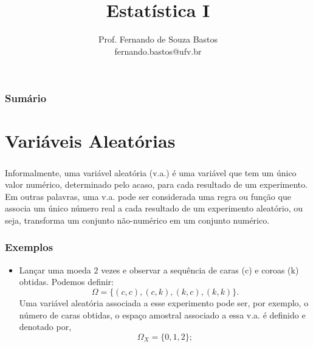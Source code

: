 \documentclass[14pt,aspectratio=1610]{beamer}
\title{Estatística I}
\author{Prof. Fernando de Souza Bastos \texorpdfstring{\\ fernando.bastos@ufv.br}{}}
\institute{Departamento de Estatística \texorpdfstring{\\ Universidade Federal de Viçosa}{}\texorpdfstring{\\ Campus UFV - Viçosa}{}}
\date{}
\begin{document}
%

\frame{\titlepage}

\begin{frame}{}
\frametitle{\bf Sumário}
\tableofcontents
\end{frame}

\section{Variáveis Aleatórias}
\begin{frame}{}
\frametitle{}
\begin{block}{}
\justifying
Informalmente, uma variável aleatória (v.a.) é uma variável que tem um único valor numérico, determinado pelo acaso, para cada resultado de um experimento. Em outras palavras, uma v.a. pode ser considerada uma regra ou função que associa um único número real a cada resultado de um experimento alea\-tó\-rio, ou seja, transforma um conjunto não-numérico em um conjunto numérico.
\end{block}
\end{frame}

\begin{frame}{}
\frametitle{Exemplos}
\begin{block}{}
\justifying
\begin{itemize}
\item Lançar uma moeda $2$ vezes e observar a sequência de caras (c) e coroas (k) obtidas. Podemos definir: $$\Omega=\{(c,c),(c,k),(k,c),(k,k)\}.$$ Uma variável aleatória associada a esse experimento pode ser, por exem\-plo, o número de caras obtidas, o espaço amostral associado a essa v.a. é definido e denotado por, $$\Omega_{X}=\{0,1,2\};$$
\end{itemize}
\end{block}
\end{frame}

\end{document}
